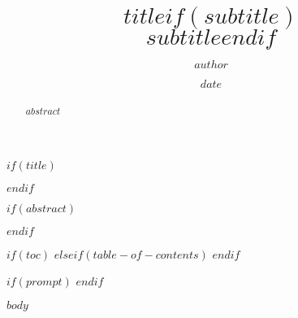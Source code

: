 \documentclass[12pt,letterpaper]{article}
\title{$title$$if(subtitle)$\\\large{$subtitle$}$endif$}
\author{$author$}
\date{$date$}
\begin{document}
    $if(title)$
    \maketitle
    $endif$

    $if(abstract)$
    \begin{abstract}
        $abstract$
    \end{abstract}
    $endif$

    $if(toc)$
    \tableofcontents
    $elseif(table-of-contents)$
    \tableofcontents
    $endif$

    $if(prompt)$
    $endif$

    $body$
\end{document}

